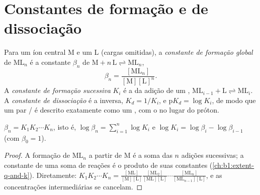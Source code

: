 \section{Constantes de formação e de dissociação}

\begin{definition}\label{def:b1:complexation:formation-constant}
Para um íon central M e um  L (cargas omitidas), a \emph{constante
de formação global} de
$\mathrm{ML}_n$ é a constante $\beta_n$ de
$\mathrm{M} + n\,\mathrm{L} \rightleftharpoons \mathrm{ML}_n$,
\[
  \beta_n = \frac{[\mathrm{ML}_n]}{[\mathrm{M}][\mathrm{L}]^n} .
\]
A \emph{constante de formação sucessiva}
$K_i$ é a da adição de um ,
$\mathrm{ML}_{i-1} + \mathrm{L} \rightleftharpoons \mathrm{ML}_i$. A
\emph{constante de dissociação} é a
inversa, $K_d = 1/K_i$, e $\mathrm{p}K_d = \log K_i$, de modo que um par
/ é descrito exatamente como um , com o
 no lugar do próton.
\end{definition}

\begin{proposition}\label{prop:b1:complexation:beta-k}
$\beta_n = K_1 K_2 \cdots K_n$, isto é,
$\log\beta_n = \sum_{i=1}^n \log K_i$ e $\log K_i = \log\beta_i -
\log\beta_{i-1}$ (com $\beta_0 = 1$).
\end{proposition}

\begin{proof}
A formação de $\mathrm{ML}_n$ a partir de M é a soma das $n$ adições
sucessivas; a constante de uma soma de reações é o produto de suas
constantes (\cref{ch:b1:extent-q-and-k}). Diretamente:
$K_1 K_2\cdots K_n = \frac{[\mathrm{ML}]}{[\mathrm{M}][\mathrm{L}]}
\frac{[\mathrm{ML_2}]}{[\mathrm{ML}][\mathrm{L}]}\cdots
\frac{[\mathrm{ML}_n]}{[\mathrm{ML}_{n-1}][\mathrm{L}]}$, e as
concentrações intermediárias se cancelam.
\end{proof}


